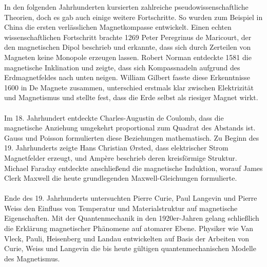 \documentclass[12pt, a4paper]{article}
\begin{document}
	In den folgenden Jahrhunderten kursierten zahlreiche pseudowissenschaftliche Theorien, doch es gab auch einige weitere Fortschritte. So wurden zum Beispiel in China die ersten verlässlichen Magnetkompasse entwickelt\cite{metioui22}.\newline
	Einen echten wissenschaftlichen Fortschritt brachte 1269 Peter Peregrinus de Maricourt, der den magnetischen Dipol beschrieb und erkannte, dass sich durch Zerteilen von Magneten keine Monopole erzeugen lassen\cite{metioui22}.\newline
	Robert Norman entdeckte 1581 die magnetische Inklination und zeigte, dass sich Kompassnadeln aufgrund des Erdmagnetfeldes nach unten neigen\cite{metioui22}.\newline
	William Gilbert fasste diese Erkenntnisse 1600 in De Magnete zusammen, unterschied erstmals klar zwischen Elektrizität und Magnetismus und stellte fest, dass die Erde selbst als riesiger Magnet wirkt\cite{singh19}.\paragraph{}
	
	Im 18. Jahrhundert entdeckte Charles-Augustin de Coulomb, dass die magnetische Anziehung umgekehrt proportional zum Quadrat des Abstands ist\cite{metioui22}.\newline
	Gauss und Poisson formulierten diese Beziehungen mathematisch. Zu Beginn des 19. Jahrhunderts zeigte Hans Christian Ørsted, dass elektrischer Strom Magnetfelder erzeugt, und Ampère beschrieb deren kreisförmige Struktur\cite{singh19}.\newline
	Michael Faraday entdeckte anschließend die magnetische Induktion, worauf James Clerk Maxwell die heute grundlegenden Maxwell-Gleichungen formulierte\cite{singh19}.\paragraph{}
	
	Ende des 19. Jahrhunderts untersuchten Pierre Curie, Paul Langevin und Pierre Weiss den Einfluss von Temperatur und Materialstruktur auf magnetische Eigenschaften\cite{singh19}.\newline
	Mit der Quantenmechanik in den 1920er-Jahren gelang schließlich die Erklärung magnetischer Phänomene auf atomarer Ebene. Physiker wie Van Vleck, Pauli, Heisenberg und Landau entwickelten auf Basis der Arbeiten von Curie, Weiss und Langevin die bis heute gültigen quantenmechanischen Modelle des Magnetismus\cite{singh19}.
		
\end{document}
